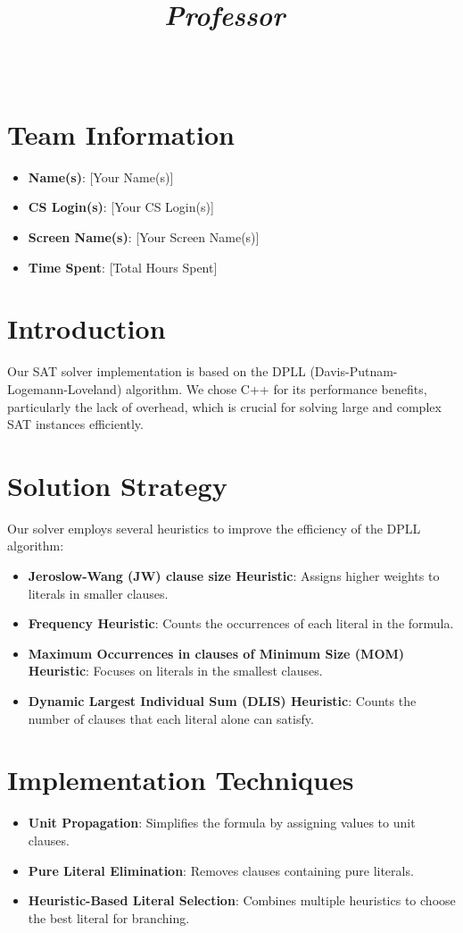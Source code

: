 \documentclass[titlepage]{article}
\title{
  \textmd{\LARGE{\textbf{\noteTitle}}}\\
  \vspace{5pt}
  \textmd{\Large{\textit{\class}}}\\
  \textmd{\Large{\textit{Professor\ \professor}}}\\
  \vspace{3.5in}
  \textmd{\LARGE{\textbf{\notesAuthor}}}\\
  \date{}
  \author{}
}
\begin{document}
\maketitle

\section*{Team Information}
\begin{itemize}
    \item \textbf{Name(s)}: [Your Name(s)]
    \item \textbf{CS Login(s)}: [Your CS Login(s)]
    \item \textbf{Screen Name(s)}: [Your Screen Name(s)]
    \item \textbf{Time Spent}: [Total Hours Spent]
\end{itemize}

\section*{Introduction}
Our SAT solver implementation is based on the DPLL (Davis-Putnam-Logemann-Loveland) algorithm. We chose C++ for its performance benefits, particularly the lack of overhead, which is crucial for solving large and complex SAT instances efficiently.

\section*{Solution Strategy}
Our solver employs several heuristics to improve the efficiency of the DPLL algorithm:
\begin{itemize}
    \item \textbf{Jeroslow-Wang (JW) clause size Heuristic}: Assigns higher weights to literals in smaller clauses.
    \item \textbf{Frequency Heuristic}: Counts the occurrences of each literal in the formula.
    \item \textbf{Maximum Occurrences in clauses of Minimum Size (MOM) Heuristic}: Focuses on literals in the smallest clauses.
    \item \textbf{Dynamic Largest Individual Sum (DLIS) Heuristic}: Counts the number of clauses that each literal alone can satisfy.
\end{itemize}

\section*{Implementation Techniques}
\begin{itemize}
    \item \textbf{Unit Propagation}: Simplifies the formula by assigning values to unit clauses.
    \item \textbf{Pure Literal Elimination}: Removes clauses containing pure literals.
    \item \textbf{Heuristic-Based Literal Selection}: Combines multiple heuristics to choose the best literal for branching.
\end{itemize}
\end{document}
